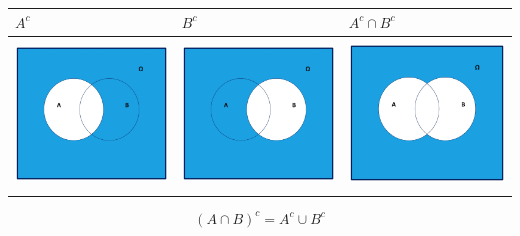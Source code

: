 \documentclass[
  letterpaper,
  DIV=11,
  numbers=noendperiod]{scrreprt}
\begin{document}
\begin{longtable}[]{@{}
  >{\centering\arraybackslash}p{}
  >{\centering\arraybackslash}p{}
  >{\centering\arraybackslash}p{}@{}}
\toprule\noalign{}
\begin{minipage}[b]{\linewidth}\centering
\(A^c\)
\end{minipage} & \begin{minipage}[b]{\linewidth}\centering
\(B^c\)
\end{minipage} & \begin{minipage}[b]{\linewidth}\centering
\(A^c\cap B^c\)
\end{minipage} \\
\midrule\noalign{}
\endhead
\bottomrule\noalign{}
\endlastfoot
\includegraphics[width=\linewidth,height=1.5625in,keepaspectratio]{Images/venn1Ac_conB.jpeg}
&
\includegraphics[width=\linewidth,height=1.5625in,keepaspectratio]{Images/venn1Bc_conA.jpeg}
&
\includegraphics[width=\linewidth,height=1.5625in,keepaspectratio]{Images/venn1interseccioncomplementarios.jpeg} \\
\end{longtable}

\[(A\cap B)^c=A^c\cup B^c\]
\end{document}

